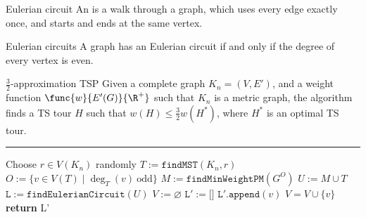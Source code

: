 \documentclass[a4paper, 12pt]{report}
\begin{document}
    \begin{frameddefn}{Eulerian circuit}
        An  is a walk through a graph, which uses every edge exactly once, and starts and ends at the same vertex.
    \end{frameddefn}

    \begin{framedthm}[label={eul circ}]{Eulerian circuits}
        A graph has an Eulerian circuit if and only if the degree of every vertex is even.
    \end{framedthm}

    \begin{framedalgo}{$\frac{3}{2}$-approximation TSP}
        Given a complete graph $K_n = (V, E')$, and a weight function $\func{w}{E'(G)}{\R^+}$ such that $K_n$ is a metric graph, the algorithm finds a TS tour $H$ such that $w(H) \le \frac{3}{2}w(H^*)$, where $H^*$ is an optimal TS tour. \\
        \hrule

        \quad
        \label{alg:3/2-approx_tsp}
        \begin{algorithmic}[1]
                \State Choose $r \in V(K_n)$ randomly
                \State $T := \texttt{findMST}(K_n, r)$ 
                \State $O := \{v \in V(T) \mid \deg_T(v) \ \mathrm{odd}\}$ 
                \State $M := \texttt{findMinWeightPM}(G^O)$ 
                \State $U := M \cup T$ 
                \State $\texttt L := \texttt{findEulerianCircuit}(U)$
                \State $V := \varnothing$
                \State $\texttt L' := \texttt{[]}$
                        \State $\texttt L'.\texttt{append}(v)$
                        \State $V = V \cup \{v\}$
                    \EndIf
                \EndFor
                \State \textbf{return} \ttt L' 
            \EndFunction
        \end{algorithmic}
    \end{framedalgo}
\end{document}

